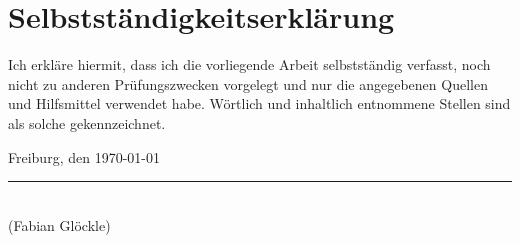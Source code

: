 
\chapter*{Selbstständigkeitserklärung}
\thispagestyle{empty}

Ich erkläre hiermit, dass ich die vorliegende Arbeit selbstständig
verfasst, noch nicht zu anderen Prüfungszwecken vorgelegt und nur die
angegebenen Quellen und Hilfsmittel verwendet habe. Wörtlich und
inhaltlich entnommene Stellen sind als solche gekennzeichnet.

\vspace{1cm}
\noindent
Freiburg, den \today

\vspace{1.5cm}

\noindent\rule{.5\textwidth}{0.3mm} \\
\noindent
(Fabian Glöckle)
